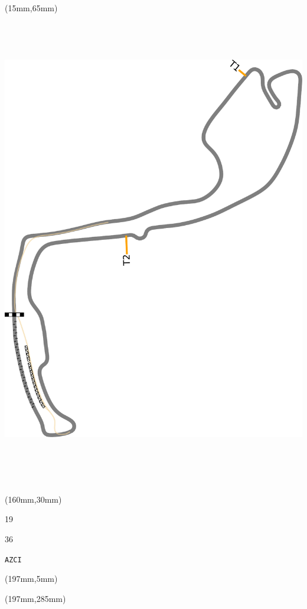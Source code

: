 \begin{textblock*}{185mm}(15mm,65mm)%
\centering
\mbox{\includegraphics[width=185mm,height=210mm,keepaspectratio]{PT/AZCI.pdf}}
\end{textblock*}
\begin{textblock*}{40mm}(160mm,30mm)%
\Large
\par{} 
\par19 
\par36 
\par\hfill\tiny\tt AZCI\\
\end{textblock*}
\begin{textblock*}{20mm}(197mm,5mm)%
\fbox{\thepage}
\label{AZCI}
\end{textblock*}
\begin{textblock*}{20mm}(197mm,285mm)%
\fbox{\thepage}
\end{textblock*}

